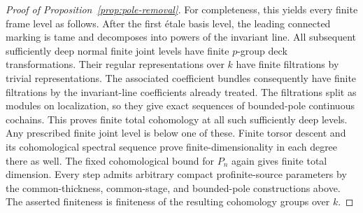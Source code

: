 \begin{proof}[Proof of Proposition~\ref{prop:pole-removal}]
For completeness, this yields every finite frame level as follows.
After the first \'etale basis level, the leading connected marking
is tame and decomposes into powers of the invariant line.  All
subsequent sufficiently deep normal finite joint levels have
finite $p$-group deck transformations.  Their regular
representations over $k$ have finite filtrations by trivial
representations.  The associated coefficient bundles consequently
have finite filtrations by the invariant-line coefficients already
treated.  The filtrations split as modules on localization, so
they give exact sequences of bounded-pole continuous cochains.
This proves finite total cohomology at all such sufficiently deep
levels.  Any prescribed finite joint level is below one of these.
Finite torsor descent and its cohomological spectral sequence
prove finite-dimensionality in each degree there as well.  The
fixed cohomological bound for $P_n$ again gives finite total
dimension.  Every step admits arbitrary compact profinite-source
parameters by the common-thickness, common-stage, and bounded-pole
constructions above.  The asserted finiteness is finiteness of the
resulting cohomology groups over $k$.
\end{proof}
